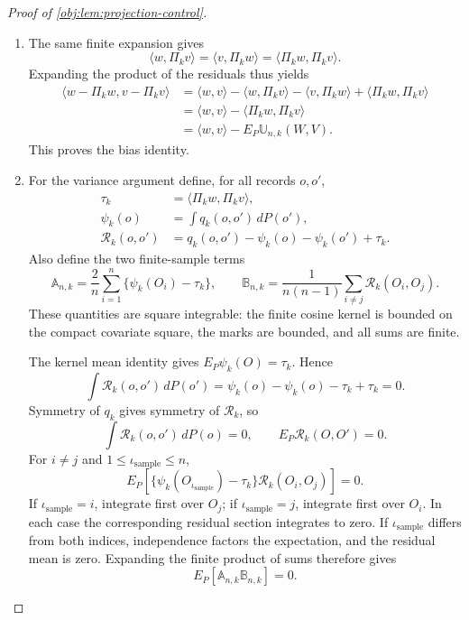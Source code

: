 \begin{proof}[Proof of \cref{obj:lem:projection-control}]
\begin{enumerate}
\item The same finite expansion gives
\[
\langle w,\Pi_kv\rangle
=\langle v,\Pi_kw\rangle
=\langle\Pi_kw,\Pi_kv\rangle.
\]
Expanding the product of the residuals thus yields
\[
\begin{aligned}
\langle w-\Pi_kw,v-\Pi_kv\rangle
&=\langle w,v\rangle-\langle w,\Pi_kv\rangle
 -\langle v,\Pi_kw\rangle+\langle\Pi_kw,\Pi_kv\rangle\\
&=\langle w,v\rangle-\langle\Pi_kw,\Pi_kv\rangle\\
&=\langle w,v\rangle-E_P\mathbb U_{n,k}(W,V).
\end{aligned}
\]
This proves the bias identity.

\item For the variance argument define, for all records \(o,o'\),
\[
\begin{aligned}
\tau_k&=\langle\Pi_kw,\Pi_kv\rangle,\\
\psi_k(o)&=\int q_k(o,o')\,dP(o'),\\
\mathcal R_k(o,o')
&=q_k(o,o')-\psi_k(o)-\psi_k(o')+\tau_k.
\end{aligned}
\]
Also define the two finite-sample terms
\[
\mathbb A_{n,k}
=\frac2n\sum_{i=1}^n\{\psi_k(O_i)-\tau_k\},
\qquad
\mathbb B_{n,k}
=\frac1{n(n-1)}\sum_{i\ne j}\mathcal R_k(O_i,O_j).
\]
These quantities are square integrable: the finite cosine kernel is bounded on the compact covariate square, the marks are bounded, and all sums are finite.

The kernel mean identity gives \(E_P\psi_k(O)=\tau_k\). Hence
\[
\int\mathcal R_k(o,o')\,dP(o')
=\psi_k(o)-\psi_k(o)-\tau_k+\tau_k=0.
\]
Symmetry of \(q_k\) gives symmetry of \(\mathcal R_k\), so
\[
\int\mathcal R_k(o,o')\,dP(o)=0,
\qquad
E_P\mathcal R_k(O,O')=0.
\]
For \(i\ne j\) and \(1\le\iota_{\mathrm{sample}}\le n\),
\[
E_P\!\left[
 \{\psi_k(O_{\iota_{\mathrm{sample}}})-\tau_k\}\mathcal R_k(O_i,O_j)
\right]=0.
\]
If \(\iota_{\mathrm{sample}}=i\), integrate first over \(O_j\); if \(\iota_{\mathrm{sample}}=j\), integrate first over \(O_i\). In each case the corresponding residual section integrates to zero. If \(\iota_{\mathrm{sample}}\) differs from both indices, independence factors the expectation, and the residual mean is zero. Expanding the finite product of sums therefore gives
\[
E_P[\mathbb A_{n,k}\mathbb B_{n,k}]=0.
\]


\end{enumerate}
\end{proof}
